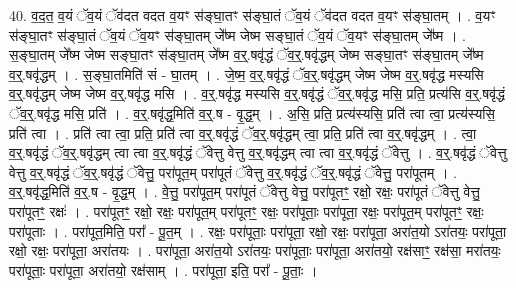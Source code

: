 \documentclass[17pt]{extarticle}
\begin{document}
40. व॒द॒त॒ व॒यं ॅव॒यं ॅव॑दत वदत व॒यꣳ स॑ङ्घा॒तꣳ स॑ङ्घा॒तं ॅव॒यं ॅव॑दत वदत व॒यꣳ स॑ङ्घा॒तम् । . व॒यꣳ स॑ङ्घा॒तꣳ स॑ङ्घा॒तं ॅव॒यं ॅव॒यꣳ स॑ङ्घा॒तम् जे᳚ष्म जेष्म सङ्घा॒तं ॅव॒यं ॅव॒यꣳ स॑ङ्घा॒तम् जे᳚ष्म । . स॒ङ्घा॒तम् जे᳚ष्म जेष्म सङ्घा॒तꣳ स॑ङ्घा॒तम् जे᳚ष्म व॒र्॒.षवृ॑द्धं ॅव॒र्॒.षवृ॑द्धम् जेष्म सङ्घा॒तꣳ स॑ङ्घा॒तम् जे᳚ष्म व॒र्॒.षवृ॑द्धम् । . स॒ङ्घा॒तमिति॑ सं - घा॒तम् । . जे॒ष्म॒ व॒र्॒.षवृ॑द्धं ॅव॒र्॒.षवृ॑द्धम् जेष्म जेष्म व॒र्॒.षवृ॑द्ध मस्यसि व॒र्॒.षवृ॑द्धम् जेष्म जेष्म व॒र्॒.षवृ॑द्ध मसि । . व॒र्॒.षवृ॑द्ध मस्यसि व॒र्॒.षवृ॑द्धं ॅव॒र्॒.षवृ॑द्ध मसि॒ प्रति॒ प्रत्य॑सि व॒र्॒.षवृ॑द्धं ॅव॒र्॒.षवृ॑द्ध मसि॒ प्रति॑ । . व॒र्॒.षवृ॑द्ध॒मिति॑ व॒र्॒.ष - वृ॒द्ध॒म् । . अ॒सि॒ प्रति॒ प्रत्य॑स्यसि॒ प्रति॑ त्वा त्वा॒ प्रत्य॑स्यसि॒ प्रति॑ त्वा । . प्रति॑ त्वा त्वा॒ प्रति॒ प्रति॑ त्वा व॒र्॒.षवृ॑द्धं ॅव॒र्॒.षवृ॑द्धम् त्वा॒ प्रति॒ प्रति॑ त्वा व॒र्॒.षवृ॑द्धम् । . त्वा॒ व॒र्॒.षवृ॑द्धं ॅव॒र्॒.षवृ॑द्धम् त्वा त्वा व॒र्॒.षवृ॑द्धं ॅवेत्तु वेत्तु व॒र्॒.षवृ॑द्धम् त्वा त्वा व॒र्॒.षवृ॑द्धं ॅवेत्तु । . व॒र्॒.षवृ॑द्धं ॅवेत्तु वेत्तु व॒र्॒.षवृ॑द्धं ॅव॒र्॒.षवृ॑द्धं ॅवेत्तु॒ परा॑पूत॒म् परा॑पूतं ॅवेत्तु व॒र्॒.षवृ॑द्धं ॅव॒र्॒.षवृ॑द्धं ॅवेत्तु॒ परा॑पूतम् । . व॒र्॒.षवृ॑द्ध॒मिति॑ व॒र्॒.ष - वृ॒द्ध॒म् । . वे॒त्तु॒ परा॑पूत॒म् परा॑पूतं ॅवेत्तु वेत्तु॒ परा॑पूतꣳ॒॒ रक्षो॒ रक्षः॒ परा॑पूतं ॅवेत्तु वेत्तु॒ परा॑पूतꣳ॒॒ रक्षः॑ । . परा॑पूतꣳ॒॒ रक्षो॒ रक्षः॒ परा॑पूत॒म् परा॑पूतꣳ॒॒ रक्षः॒ परा॑पूताः॒ परा॑पूता॒ रक्षः॒ परा॑पूत॒म् परा॑पूतꣳ॒॒ रक्षः॒ परा॑पूताः । . परा॑पूत॒मिति॒ परा᳚ - पू॒त॒म् । . रक्षः॒ परा॑पूताः॒ परा॑पूता॒ रक्षो॒ रक्षः॒ परा॑पूता॒ अरा॑त॒यो ऽरा॑तयः॒ परा॑पूता॒ रक्षो॒ रक्षः॒ परा॑पूता॒ अरा॑तयः । . परा॑पूता॒ अरा॑त॒यो ऽरा॑तयः॒ परा॑पूताः॒ परा॑पूता॒ अरा॑तयो॒ रक्ष॑साꣳ॒॒ रक्ष॑सा॒ मरा॑तयः॒ परा॑पूताः॒ परा॑पूता॒ अरा॑तयो॒ रक्ष॑साम् । . परा॑पूता॒ इति॒ परा᳚ - पू॒ताः॒ । \newline
\end{document}
